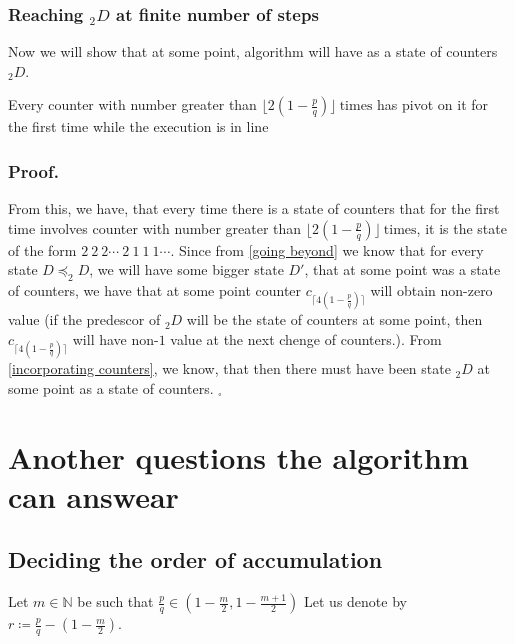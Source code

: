 \subsubsection{Reaching $_2D$ at finite number of steps}
Now we will show that at some point, algorithm will have as a state of counters $_2D$. 

\begin{lemma}\label{incorporating counters}
Every counter with number greater than $\lfloor 2(1-\frac{p}{q})\rfloor\ \mathrm{times}$ 
has pivot on it for the first time while the execution is in line 
\end{lemma}
\subsubsection{Proof.}


From this, we have, that every time there is a state of counters that for the first time 
involves counter with number greater than 
$\lfloor 2(1-\frac{p}{q})\rfloor\ \mathrm{times}$, it is the state 
of the form $2\ 2\ 2\cdots\ 2\ 1\ 1\ 1\cdots$. 
Since from \ref{going beyond} 
we know that for every state $D \preceq _2D$, 
we will have some bigger state $D'$, that at some point was a state of counters, we 
have that at some point counter $c_{\lceil 4(1-\frac{p}{q})\rceil}$ will 
obtain non-zero value (if the predescor of $_2 D$ will be the state of counters 
at some point, then $c_{\lceil 4(1-\frac{p}{q})\rceil}$ will have non-$1$ value at the 
next chenge of counters.). 
From \ref{incorporating counters}, we know, that then there must have been state $_2D$ 
at some point as a state of counters. 
$_\square$





\section{Another questions the algorithm can answear}
\subsection{Deciding the order of accumulation}
Let $m \in \mathbb{N}$ be such that $\frac{p}{q} \in (1-\frac{m}{2},1-
\frac{m+1}{2})$
Let us denote by $r \coloneqq \frac{p}{q} - (1-\frac{m}{2})$. \\ 

